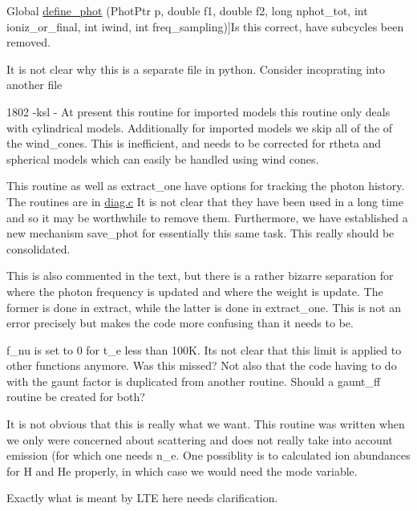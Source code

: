 \begin{DoxyRefList}
Global \hyperlink{templates_8h_aa943bd857500a1f2937d8b97d84ff633}{define\+\_\+phot} (Phot\+Ptr p, double f1, double f2, long nphot\+\_\+tot, int ioniz\+\_\+or\+\_\+final, int iwind, int freq\+\_\+sampling)]Is this correct, have subcycles been removed. 
\item[\label{bug__bug000016}%
\Hypertarget{bug__bug000016}%
File \hyperlink{density_8c}{density.c} ]It is not clear why this is a separate file in python. Consider incoprating into another file  
\item[\label{bug__bug000042}%
\Hypertarget{bug__bug000042}%
Global \hyperlink{templates_8h_a8bc3604c533b18b872bb155bfd444bb5}{ds\+\_\+to\+\_\+wind} (Phot\+Ptr pp, int $\ast$ndom\+\_\+current)]1802 -\/ksl -\/ At present this routine for imported models this routine only deals with cylindrical models. Additionally for imported models we skip all of the of the wind\+\_\+cones. This is inefficient, and needs to be corrected for rtheta and spherical models which can easily be handled using wind cones. 
\item[\label{bug__bug000024}%
\Hypertarget{bug__bug000024}%
Global \hyperlink{templates_8h_a280fcbb3dddfaf58a73b2a8d6fd61c76}{extract} (Wind\+Ptr w, Phot\+Ptr p, int itype)]This routine as well as extract\+\_\+one have options for tracking the photon history. The routines are in \hyperlink{diag_8c}{diag.\+c} It is not clear that they have been used in a long time and so it may be worthwhile to remove them. Furthermore, we have established a new mechanism save\+\_\+phot for essentially this same task. This really should be consolidated. 

This is also commented in the text, but there is a rather bizarre separation for where the photon frequency is updated and where the weight is update. The former is done in extract, while the latter is done in extract\+\_\+one. This is not an error precisely but makes the code more confusing than it needs to be. 
\item[\label{bug__bug000023}%
\Hypertarget{bug__bug000023}%
Global \hyperlink{templates_8h_ade7eab896d4188a5b8a4ed6845d33150}{ff} (Wind\+Ptr one, double t\+\_\+e, double freq)]f\+\_\+nu is set to 0 for t\+\_\+e less than 100K. It\textquotesingle{}s not clear that this limit is applied to other functions anymore. Was this missed? Not also that the code having to do with the gaunt factor is duplicated from another routine. Should a gaunt\+\_\+ff routine be created for both? 
\item[\label{bug__bug000053}%
\Hypertarget{bug__bug000053}%
Global \hyperlink{templates_8h_ad350a11e70a4518fb86b842942575e26}{fix\+\_\+concentrations} (Plasma\+Ptr xplasma, int mode)]It is not obvious that this is really what we want. This routine was written when we only were concerned about scattering and does not really take into account emission (for which one needs n\+\_\+e. One possiblity is to calculated ion abundances for H and He properly, in which case we would need the mode variable. 
\item[\label{bug__bug000026}%
\Hypertarget{bug__bug000026}%
Global \hyperlink{get__atomicdata_8c_ae8afa865c507915363062a5abd9c32b7}{get\+\_\+atomic\+\_\+data} (masterfile)]Exactly what is meant by L\+TE here needs clarification.


\end{DoxyRefList}
